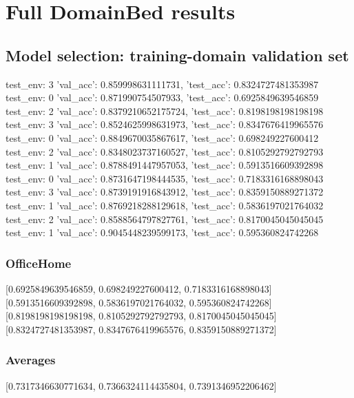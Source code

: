 \documentclass{article}
\begin{document}
\section{Full DomainBed results}

\subsection{Model selection: training-domain validation set}
test_env: 3
{'val_acc': 0.859998631111731, 'test_acc': 0.8324727481353987}
test_env: 0
{'val_acc': 0.871990754507933, 'test_acc': 0.6925849639546859}
test_env: 2
{'val_acc': 0.8379210652175724, 'test_acc': 0.8198198198198198}
test_env: 3
{'val_acc': 0.8524625998631973, 'test_acc': 0.8347676419965576}
test_env: 0
{'val_acc': 0.8849670035867617, 'test_acc': 0.698249227600412}
test_env: 2
{'val_acc': 0.8348023737160527, 'test_acc': 0.8105292792792793}
test_env: 1
{'val_acc': 0.8788491447957053, 'test_acc': 0.5913516609392898}
test_env: 0
{'val_acc': 0.8731647198444535, 'test_acc': 0.7183316168898043}
test_env: 3
{'val_acc': 0.8739191916843912, 'test_acc': 0.8359150889271372}
test_env: 1
{'val_acc': 0.8769218288129618, 'test_acc': 0.5836197021764032}
test_env: 2
{'val_acc': 0.8588564797827761, 'test_acc': 0.8170045045045045}
test_env: 1
{'val_acc': 0.9045448239599173, 'test_acc': 0.595360824742268}

\subsubsection{OfficeHome}
[0.6925849639546859, 0.698249227600412, 0.7183316168898043]
[0.5913516609392898, 0.5836197021764032, 0.595360824742268]
[0.8198198198198198, 0.8105292792792793, 0.8170045045045045]
[0.8324727481353987, 0.8347676419965576, 0.8359150889271372]

\begin{center}
\end{center}

\subsubsection{Averages}
[0.7317346630771634, 0.7366324114435804, 0.7391346952206462]

\begin{center}
\end{center}
\end{document}

